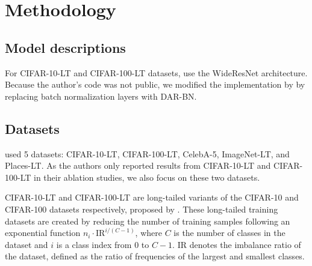 \section{Methodology}




\subsection{Model descriptions}

For CIFAR-10-LT and CIFAR-100-LT datasets, \citet{PureNoise} use the WideResNet \citep{WideResNet} architecture. Because the author's code was not public, we modified the implementation by \citet{torchdistill} by replacing batch normalization layers with DAR-BN.


\subsection{Datasets}

\citet{PureNoise} used 5 datasets: CIFAR-10-LT, CIFAR-100-LT, CelebA-5, ImageNet-LT, and Places-LT. As the authors only reported results from CIFAR-10-LT and CIFAR-100-LT in their ablation studies, we also focus on these two datasets.

CIFAR-10-LT and CIFAR-100-LT are long-tailed variants of the CIFAR-10 and CIFAR-100 datasets respectively, proposed by \citet{ClassBalancedLoss}. These long-tailed training datasets are created by reducing the number of training samples following an exponential function $n_i \cdot \text{IR}^{i/(C-1)}$, where $C$ is the number of classes in the dataset and $i$ is a class index from $0$ to $C-1$. IR denotes the imbalance ratio of the dataset, defined as the ratio of frequencies of the largest and smallest classes. 


